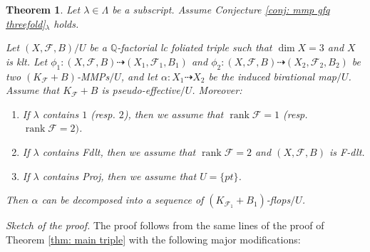\documentclass[11pt]{amsart}
\numberwithin{equation}{section}
\newcommand{\Qq}{\mathbb{Q}}
\newcommand{\rk}{\operatorname{rank}}
\newcommand{\Ff}{\mathcal{F}}
\newtheorem{thm}{Theorem}[section]
\theoremstyle{definition}
\theoremstyle{definition}
\theoremstyle{definition}
\begin{document}
\begin{thm}\label{thm: assume gfq mmp get flop connection}
Let $\lambda\in\Lambda$ be a subscript. Assume Conjecture \ref{conj: mmp gfq threefold}{$_\lambda$} holds. 

Let $(X,\Ff,B)/U$ be a $\Qq$-factorial lc foliated triple such that $\dim X=3$ and $X$ is klt. Let $\phi_1: (X,\Ff,B)\dashrightarrow (X_1,\Ff_1,B_1)$ and $\phi_2: (X,\Ff,B)\dashrightarrow (X_2,\Ff_2,B_2)$ be two $(K_{\Ff}+B)$-MMPs$/U$, and let $\alpha: X_1\dashrightarrow X_2$ be the induced birational map$/U$. Assume that $K_{\Ff}+B$ is pseudo-effective$/U$. Moreover:
\begin{enumerate}
    \item If $\lambda$ contains $1$ (resp. $2$), then we assume that $\rk\Ff=1$ (resp. $\rk\Ff=2)$.
    \item If $\lambda$ contains Fdlt, then we assume that $\rk\Ff=2$ and $(X,\Ff,B)$ is F-dlt.
    \item If $\lambda$ contains Proj, then we assume that $U=\{pt\}$.
\end{enumerate}
Then $\alpha$ can be decomposed into a sequence of $(K_{\Ff_1}+B_1)$-flops$/U$. 
\end{thm}
\noindent\textit{Sketch of the proof.} The proof follows from the same lines of the proof of Theorem \ref{thm: main triple} with the following major modifications:
\end{document}
